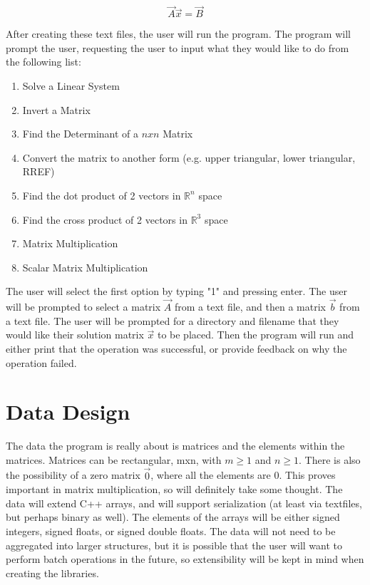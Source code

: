\documentclass[12pt]{article}
\begin{document}
\begin{equation}
\vec{A}\vec{x} = \vec{B}
\end{equation}

After creating these text files, the user will run the program. The program will prompt the user, requesting the user to input what they would like to do from the following list:
\begin{enumerate}
	\item Solve a Linear System
	\item Invert a Matrix
	\item Find the Determinant of a $nxn$ Matrix
	\item Convert the matrix to another form (e.g. upper triangular, lower triangular, RREF)
	\item Find the dot product of 2 vectors in $\mathbb{R}^n$ space
	\item Find the cross product of 2 vectors in $\mathbb{R}^3$ space
	\item Matrix Multiplication
	\item Scalar Matrix Multiplication
\end{enumerate}

The user will select the first option by typing "1" and pressing enter. The user will be prompted to select a matrix $\vec{A}$ from a text file, and then a matrix $\vec{b}$ from a text file. The user will be prompted for a directory and filename that they would like their solution matrix $\vec{x}$ to be placed. Then the program will run and either print that the operation was successful, or provide feedback on why the operation failed.

\section{Data Design}
The data the program is really about is matrices and the elements within the matrices. Matrices can be rectangular, mxn, with $m\geq1$ and $n\geq1$. There is also the possibility of a zero matrix $\vec{0}$, where all the elements are 0. This proves important in matrix multiplication, so will definitely take some thought. The data will extend C++ arrays, and will support serialization (at least via textfiles, but perhaps binary as well). The elements of the arrays will be either signed integers, signed floats, or signed double floats. The data will not need to be aggregated into larger structures, but it is possible that the user will want to perform batch operations in the future, so extensibility will be kept in mind when creating the libraries.
\end{document}
